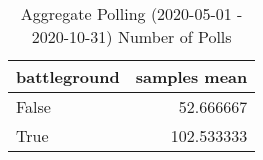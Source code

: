 \begin{table}
\centering
\caption{Aggregate Polling (2020-05-01 - 2020-10-31) Number of Polls}
\label{table:aggregate\_polling\_2020-05-01\_-\_2020-10-31\_number\_of\_polls}
\begin{tabular}{lr}
\toprule
 battleground &  samples mean \\
\midrule
        False &     52.666667 \\
         True &    102.533333 \\
\bottomrule
\end{tabular}
\end{table}
